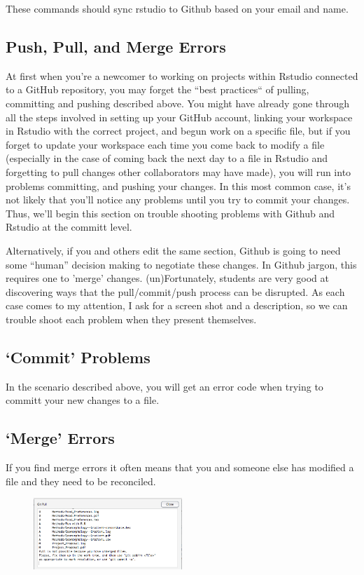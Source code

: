 \documentclass[12pt]{../SOP4_alpha}\usepackage[]{graphicx}\usepackage[]{color}
\begin{document}
\NP These commands should sync rstudio to Github based on your email and name.


\subsection{Push, Pull, and Merge Errors}

\NP At first when you're a newcomer to working on projects within Rstudio connected to a GitHub repository, you may forget the ``best practices`` of pulling, committing and pushing described above. You might have already gone through all the steps involved in setting up your GitHub account, linking your workspace in Rstudio with the correct project, and begun work on a specific file, but if you forget to update your workspace each time you come back to modify a file (especially in the case of coming back the next day to a file in Rstudio and forgetting to pull changes other collaborators may have made), you will run into problems committing, and pushing your changes. In this most common case, it's not likely that you'll notice any problems until you try to commit your changes. Thus, we'll begin this section on trouble shooting problems with Github and Rstudio at the committ level.

\NP Alternatively, if you and others edit the same section, Github is going to need some ``human'' decision making to negotiate these changes. In Github jargon, this requires one to 'merge' changes. 
\NP (un)Fortunately, students are very good at discovering ways that the pull/commit/push process can be disrupted. As each case comes to my attention, I ask for a screen shot and a description, so we can trouble shoot each problem when they present themselves.

\subsection{`Commit' Problems}
\NP In the scenario described above, you will get an error code when trying to committ your new changes to a file. 

\subsection{`Merge' Errors}

\NP If you find merge errors it often means that you and someone else has modified a file and they need to be reconciled.

\begin{figure}
\centering
\includegraphics[width=0.5\textwidth]{graphics/UnmergedError.jpg}
\end{figure}
\end{document}
